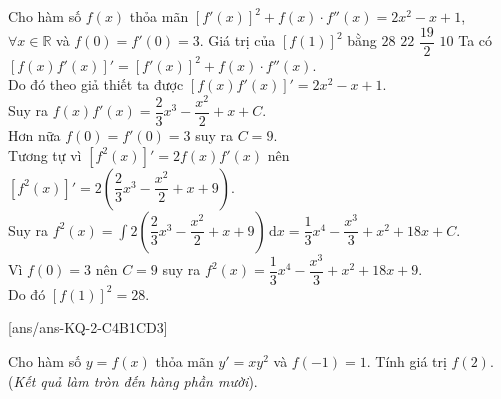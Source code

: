 \begin{ex}%
	Cho hàm số $ f(x)$ thỏa mãn $\left[f'(x)\right]^2+f(x)\cdot f''(x)=2x^2-x+1$, $\forall x\in\mathbb{R}$ và $ f(0)=f'(0)=3$. Giá trị của $\left[f(1)\right]^2$ bằng
	\choice
	{\True $ 28$}
	{$ 22$}
	{$\dfrac{19}{2}$}
	{$ 10$}
	\loigiai
	{
		Ta có $\left[f(x){f}'(x)\right]'=\left[f'(x)\right]^2+f(x)\cdot f''(x)$.\\
		Do đó theo giả thiết ta được $\left[f(x){f}'(x)\right]'=2x^2-x+1$.\\
		Suy ra $f(x){f}'(x)=\dfrac{2}{3}{x^3}-\dfrac{x^2}{2}+x+C$.\\
		 Hơn nữa $ f(0)=f'(0)=3$ suy ra $ C=9$.\\
		Tương tự vì $\left[f^2(x)\right]'=2f(x){f}'(x)$ nên $\left[f^2(x)\right]'=2\left(\dfrac{2}{3}{x^3}-\dfrac{x^2}{2}+x+9\right)$.\\
		Suy ra $f^2(x)=\displaystyle\int{2\left(\dfrac{2}{3}{x^3}-\dfrac{x^2}{2}+x+9\right)\mathrm{\,d}x}=\dfrac{1}{3}{x^4}-\dfrac{x^3}{3}+x^2+18x+C$.\\
		Vì $ f(0)=3$ nên $C=9$ suy ra $f^2(x)=\dfrac{1}{3}{x^4}-\dfrac{x^3}{3}+x^2+18x+9$.\\
		Do đó $\left[f(1)\right]^2=28$.
		}
\end{ex}

\TNSA
{}[ans/ans-KQ-2-C4B1CD3]
\begin{ex}%
	Cho hàm số $ y=f(x)$ thỏa mãn $y'=x{y^2}$ và $ f\left(-1\right)=1$. Tính giá trị $f(2)$. (\textit{Kết quả làm tròn đến hàng phần mười}).
		\end{ex}
		
